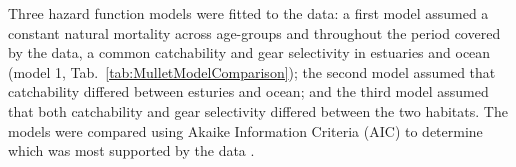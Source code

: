 Three hazard function models were fitted to the data: a first model assumed a constant natural mortality across age-groups and throughout the period covered by the data, a common catchability and gear selectivity in estuaries and ocean (model 1, Tab.~\ref{tab:MulletModelComparison}); the second model assumed that catchability differed between esturies and ocean; and the third model assumed that both catchability and gear selectivity differed between the two habitats. The models were compared using Akaike Information Criteria (AIC) to determine which was most supported by the data \citep{Burnb03}.\\


